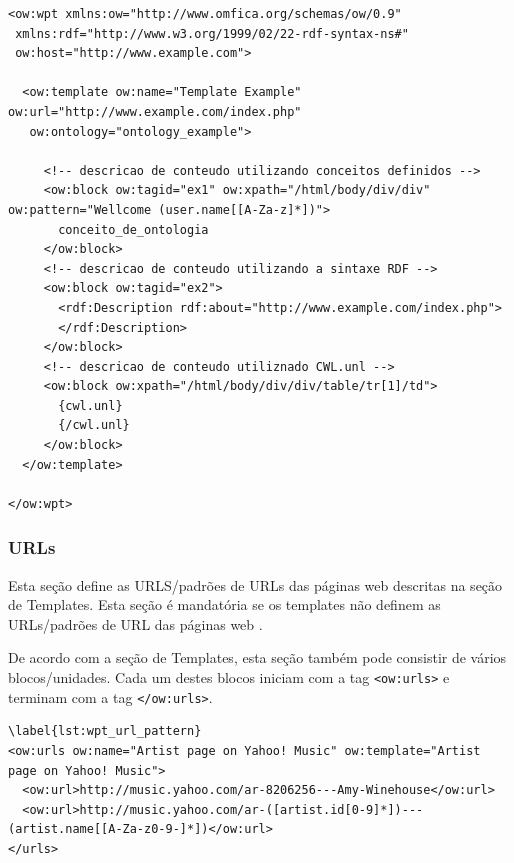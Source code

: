 \pagebreak
{}
\begin{lstlisting}
<ow:wpt xmlns:ow="http://www.omfica.org/schemas/ow/0.9"
 xmlns:rdf="http://www.w3.org/1999/02/22-rdf-syntax-ns#"
 ow:host="http://www.example.com">

  <ow:template ow:name="Template Example" ow:url="http://www.example.com/index.php"
   ow:ontology="ontology_example">

     <!-- descricao de conteudo utilizando conceitos definidos -->
     <ow:block ow:tagid="ex1" ow:xpath="/html/body/div/div" ow:pattern="Wellcome (user.name[[A-Za-z]*])">
       conceito_de_ontologia
     </ow:block>
     <!-- descricao de conteudo utilizando a sintaxe RDF -->
     <ow:block ow:tagid="ex2">
       <rdf:Description rdf:about="http://www.example.com/index.php">
       </rdf:Description>
     </ow:block>
     <!-- descricao de conteudo utiliznado CWL.unl -->
     <ow:block ow:xpath="/html/body/div/div/table/tr[1]/td">
       {cwl.unl}
       {/cwl.unl}
     </ow:block>
  </ow:template>

</ow:wpt>
\end{lstlisting}

\subsubsection{URLs}

Esta seção define as URLS/padrões de URLs das páginas web descritas na seção de Templates. Esta seção é mandatória se os templates não definem as URLs/padrões de URL das páginas web \cite{wpt}.

De acordo com a seção de Templates, esta seção também pode consistir de vários blocos/unidades. Cada um destes blocos iniciam com a tag \texttt{<ow:urls>} e terminam com a tag \texttt{</ow:urls>}.


\begin{lstlisting}
\label{lst:wpt_url_pattern}
<ow:urls ow:name="Artist page on Yahoo! Music" ow:template="Artist page on Yahoo! Music">
  <ow:url>http://music.yahoo.com/ar-8206256---Amy-Winehouse</ow:url>
  <ow:url>http://music.yahoo.com/ar-([artist.id[0-9]*])---(artist.name[[A-Za-z0-9-]*])</ow:url>
</urls>
\end{lstlisting}

